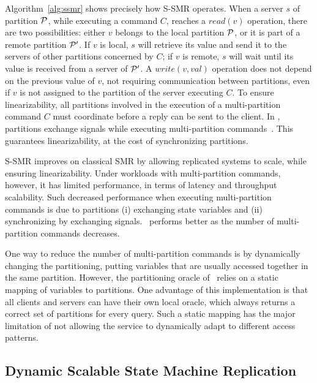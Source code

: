 Algorithm~\ref{alg:ssmr} shows precisely how S-SMR operates. When a server $s$ of partition $\mathcal{P}$, while executing a command $C$, reaches a $read(v)$ operation, there are two possibilities:
either $v$ belongs to the local partition $\mathcal{P}$,
or it is part of a remote partition $\mathcal{P}'$. 
If $v$ is local, $s$ will retrieve its value and send it to the servers of other partitions concerned by $C$;
if $v$ is remote, $s$ will wait until its value is received from a server of $\mathcal{P}'$. 
A $write(v, val)$ operation does not depend on the previous value of $v$, not requiring communication between partitions, even if $v$ is not assigned to the partition of the server executing $C$.
To ensure linearizability, all partitions involved in the execution of a multi-partition command $C$ must coordinate before a reply can be sent to the client.
In \ssmr{}, partitions exchange signals while executing multi-partition commands~\cite{bezerra2014ssmr}.
This guarantees linearizability, at the cost of synchronizing partitions.

S-SMR improves on classical SMR by allowing replicated systems to scale, while ensuring linearizability. 
Under workloads with multi-partition commands, however, it has limited performance, in terms of latency and throughput scalability. 
Such decreased performance when executing multi-partition commands is due to
partitions (i) exchanging state variables
and (ii) synchronizing by exchanging signals.
\ssmr\ performs better as the number of multi-partition commands decreases.

One way to reduce the number of multi-partition commands is by dynamically changing the partitioning, putting variables that are usually accessed together in the same partition.
However, the partitioning oracle of \ssmr\ relies on a static mapping of variables to partitions.
One advantage of this implementation is that all clients and servers can have their own local oracle, which always returns a correct set of partitions for every query.
Such a static mapping has the major limitation of not allowing the service to dynamically adapt to different access patterns.

\subsection{Dynamic Scalable State Machine Replication}

